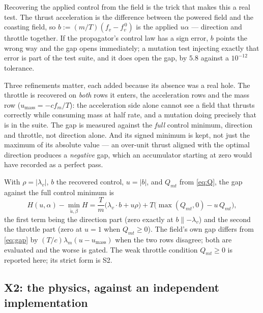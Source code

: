 \documentclass[11pt]{article}
\newcommand{\lv}{\lambda_v}\newcommand{\lr}{\lambda_r}\newcommand{\lm}{\lambda_m}
\newcommand{\Qmt}{Q_{mt}}
\begin{document}
\begin{intu}
Recovering the applied control from the field is the trick that makes this a
real test. The thrust acceleration is the difference between the powered field
and the coasting field, so $b := (m/T)(f_v - f_v^{\,0})$ is the applied
$u\alpha$ --- direction and throttle together. If the propagator's control law
has a sign error, $b$ points the wrong way and the gap opens immediately; a
mutation test injecting exactly that error is part of the test suite, and it
does open the gap, by $5.8$ against a $10^{-12}$ tolerance.

Three refinements matter, each added because its absence was a real hole.
The throttle is recovered on \emph{both} rows it enters, the acceleration rows
and the mass row ($u_{\text{mass}} = -cf_m/T$): the acceleration side alone
cannot see a field that thrusts correctly while consuming mass at half rate,
and a mutation doing precisely that is in the suite. The gap is measured against
the \emph{full} control minimum, direction and throttle, not direction alone.
And its signed minimum is kept, not just the maximum of its absolute value ---
an over-unit thrust aligned with the optimal direction produces a
\emph{negative} gap, which an accumulator starting at zero would have recorded
as a perfect pass.
\end{intu}

\begin{rig}
With $\rho = |\lv|$, $b$ the recovered control, $u = |b|$, and $\Qmt$ from
\eqref{eq:Q}, the gap against the full control minimum is
\begin{equation}\label{eq:gap}
H(u, \alpha) - \min_{\tilde u, \beta} H
= \frac{T}{m}\big(\lv \cdot b + u\rho\big)
+ T\big(\max(\Qmt, 0) - u\,\Qmt\big),
\end{equation}
the first term being the direction part (zero exactly at $b \parallel -\lv$)
and the second the throttle part (zero at $u = 1$ when $\Qmt \ge 0$). The
field's own gap differs from \eqref{eq:gap} by
$(T/c)\lm(u - u_{\text{mass}})$ when the two rows disagree; both are evaluated
and the worse is gated. The weak throttle condition $\Qmt \ge 0$ is reported
here; its strict form is S2.
\end{rig}

\subsection{X2: the physics, against an independent implementation}\label{sec:X2}
\end{document}
